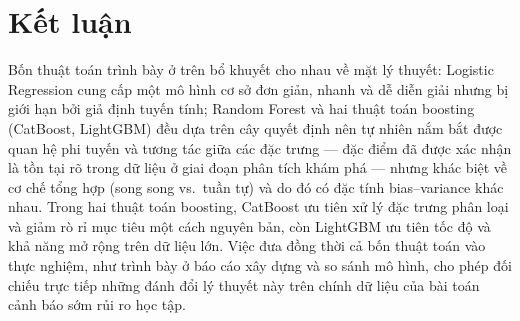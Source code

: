 \documentclass[a4paper]{article}
\begin{document}
\begin{table}[H]
  \centering
  \caption{So sánh đặc điểm lý thuyết của bốn thuật toán.}
  \label{tab:compare_theory}
  \small
\end{table}

\section{Kết luận}

Bốn thuật toán trình bày ở trên bổ khuyết cho nhau về mặt lý thuyết: Logistic
Regression cung cấp một mô hình cơ sở đơn giản, nhanh và dễ diễn giải nhưng bị
giới hạn bởi giả định tuyến tính; Random Forest và hai thuật toán boosting
(CatBoost, LightGBM) đều dựa trên cây quyết định nên tự nhiên nắm bắt được
quan hệ phi tuyến và tương tác giữa các đặc trưng --- đặc điểm đã được xác
nhận là tồn tại rõ trong dữ liệu ở giai đoạn phân tích khám phá --- nhưng khác
biệt về cơ chế tổng hợp (song song vs.\ tuần tự) và do đó có đặc tính bias--variance
khác nhau. Trong hai thuật toán boosting, CatBoost ưu tiên xử lý đặc trưng
phân loại và giảm rò rỉ mục tiêu một cách nguyên bản, còn LightGBM ưu tiên tốc
độ và khả năng mở rộng trên dữ liệu lớn. Việc đưa đồng thời cả bốn thuật toán
vào thực nghiệm, như trình bày ở báo cáo xây dựng và so sánh mô hình, cho phép
đối chiếu trực tiếp những đánh đổi lý thuyết này trên chính dữ liệu của bài
toán cảnh báo sớm rủi ro học tập.
\end{document}
